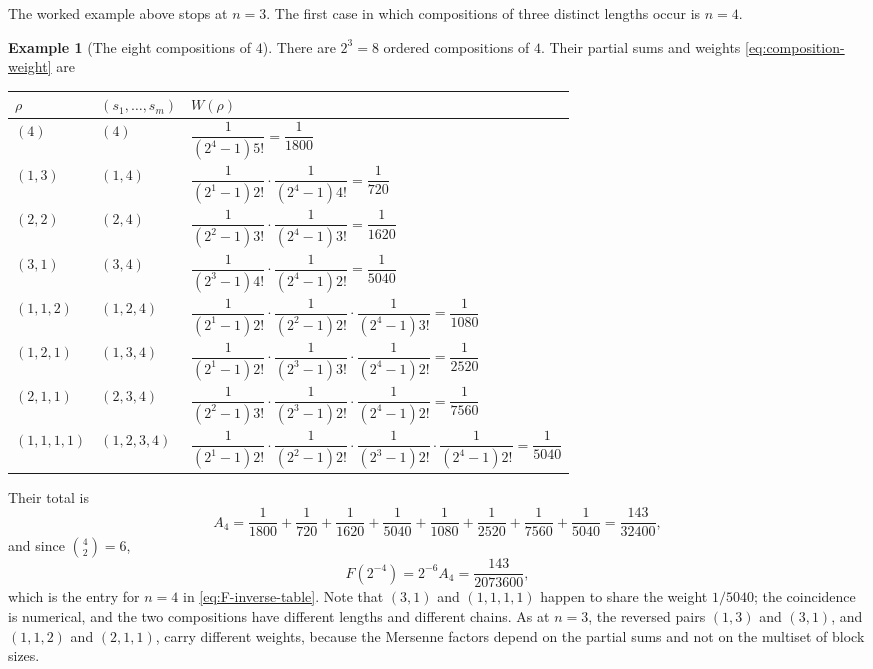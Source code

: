 \documentclass[11pt,oneside]{article}
\theoremstyle{definition}
\newtheorem{example}[theorem]{Example}
\theoremstyle{remark}
\begin{document}
The worked example above stops at $n=3$.  The first case in which compositions of three
distinct lengths occur is $n=4$.

\begin{example}[The eight compositions of $4$]
\label{ex:dy-n4-compositions}
There are $2^3=8$ ordered compositions of $4$.  Their partial sums and weights
\eqref{eq:composition-weight} are

\begin{center}
\begin{tabular}{lll}
\toprule
$\rho$&$(s_1,\ldots,s_m)$&$W(\rho)$\\
\midrule
$(4)$&$(4)$&$\dfrac1{(2^4-1)5!}=\dfrac1{1800}$\\[1.1ex]
$(1,3)$&$(1,4)$&$\dfrac1{(2^1-1)2!}\cdot\dfrac1{(2^4-1)4!}=\dfrac1{720}$\\[1.1ex]
$(2,2)$&$(2,4)$&$\dfrac1{(2^2-1)3!}\cdot\dfrac1{(2^4-1)3!}=\dfrac1{1620}$\\[1.1ex]
$(3,1)$&$(3,4)$&$\dfrac1{(2^3-1)4!}\cdot\dfrac1{(2^4-1)2!}=\dfrac1{5040}$\\[1.1ex]
$(1,1,2)$&$(1,2,4)$&$\dfrac1{(2^1-1)2!}\cdot\dfrac1{(2^2-1)2!}\cdot\dfrac1{(2^4-1)3!}
 =\dfrac1{1080}$\\[1.1ex]
$(1,2,1)$&$(1,3,4)$&$\dfrac1{(2^1-1)2!}\cdot\dfrac1{(2^3-1)3!}\cdot\dfrac1{(2^4-1)2!}
 =\dfrac1{2520}$\\[1.1ex]
$(2,1,1)$&$(2,3,4)$&$\dfrac1{(2^2-1)3!}\cdot\dfrac1{(2^3-1)2!}\cdot\dfrac1{(2^4-1)2!}
 =\dfrac1{7560}$\\[1.1ex]
$(1,1,1,1)$&$(1,2,3,4)$&$\dfrac1{(2^1-1)2!}\cdot\dfrac1{(2^2-1)2!}\cdot\dfrac1{(2^3-1)2!}
 \cdot\dfrac1{(2^4-1)2!}=\dfrac1{5040}$\\
\bottomrule
\end{tabular}
\end{center}

\noindent
Their total is
\begin{equation}
 A_4=\frac1{1800}+\frac1{720}+\frac1{1620}+\frac1{5040}
 +\frac1{1080}+\frac1{2520}+\frac1{7560}+\frac1{5040}
 =\frac{143}{32400},                                          \label{eq:dy-A4}
\end{equation}
and since $\binom42=6$,
\begin{equation*}
 F(2^{-4})=2^{-6}A_4=\frac{143}{2073600},
\end{equation*}
which is the entry for $n=4$ in \eqref{eq:F-inverse-table}.  Note that $(3,1)$ and
$(1,1,1,1)$ happen to share the weight $1/5040$; the coincidence is numerical, and the two
compositions have different lengths and different chains.  As at $n=3$, the reversed pairs
$(1,3)$ and $(3,1)$, and $(1,1,2)$ and $(2,1,1)$, carry different weights, because the
Mersenne factors depend on the partial sums and not on the multiset of block sizes.
\end{example}
\end{document}
